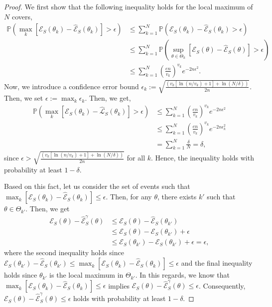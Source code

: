 \begin{proof}
We first show that the following inequality holds for the local maximum of $N$ covers,
\begin{align}
    \mathbb{P}\left(\max_{k}\left[\mathcal{E}_{S}(\theta_{k})-\hat{\mathcal{E}}_{S}(\theta_{k})\right] > \epsilon\right)
    &\leq \sum_{k=1}^{N}\mathbb{P}\left(\mathcal{E}_{S}(\theta_{k})-\hat{\mathcal{E}}_{S}(\theta_{k}) > \epsilon\right)\\
    &\leq \sum_{k=1}^{N}\mathbb{P}\left(\sup_{\theta\in\Theta_{k}}\left[\mathcal{E}_{S}(\theta)-\hat{\mathcal{E}}_{S}(\theta)\right] > \epsilon\right)\\
    &\leq\sum_{k=1}^{N}\left(\frac{en}{v_{k}}\right)^{v_{k}}e^{-2n\epsilon^{2}}.
\end{align}
Now, we introduce a confidence error bound $\epsilon_{k}:=\sqrt{\frac{\left(v_{k}\left[\ln\left(n/v_{k}\right)+1\right]+\ln\left(N/\delta\right)\right)}{2n}}$.
Then, we set $\epsilon:=\max_{k}\epsilon_{k}$. Then, we get,
\begin{align}
    \mathbb{P}\left(\max_{k}\left[\mathcal{E}_{S}(\theta_{k})-\hat{\mathcal{L}}_{S}(\theta_{k})\right] > \epsilon\right)
    &\leq\sum_{k=1}^{N}\left(\frac{en}{v_{k}}\right)^{v_{k}}e^{-2n\epsilon^{2}}\\
    &\leq\sum_{k=1}^{N}\left(\frac{en}{v_{k}}\right)^{v_{k}}e^{-2n\epsilon_{k}^{2}}\\
    &=\sum_{k=1}^{N}\frac{\delta}{N}=\delta,
\end{align}
since $\epsilon>\sqrt{\frac{\left(v_{k}\left[\ln\left(n/v_{k}\right)+1\right]+\ln\left(N/\delta\right)\right)}{2n}}$ for all $k$.
Hence, the inequality holds with probability at least $1-\delta$.

Based on this fact, let us consider the set of events such that $\max_{k}\left[\mathcal{E}_{S}(\theta_{k})-\hat{\mathcal{E}}_{S}(\theta_{k})\right] \leq \epsilon$.
Then, for any $\theta$, there exists $k'$ such that $\theta\in\Theta_{k'}$.
Then, we get
\begin{align}
    \mathcal{E}_{S}(\theta) - \hat{\mathcal{E}}_{S}^{\gamma}(\theta) &\leq \mathcal{E}_{S}(\theta) - \hat{\mathcal{E}}_{S}(\theta_{k'})\\
    &\leq \mathcal{E}_{S}(\theta) - \mathcal{E}_{S}(\theta_{k'}) + \epsilon\\
    &\leq \mathcal{E}_{S}(\theta_{k'}) - \mathcal{E}_{S}(\theta_{k'}) + \epsilon = \epsilon,
\end{align}
where the second inequality holds since $\mathcal{E}_{S}(\theta_{k'})-\hat{\mathcal{E}}_{S}(\theta_{k'})\leq\max_{k}\left[\mathcal{E}_{S}(\theta_{k})-\hat{\mathcal{E}}_{S}(\theta_{k})\right] \leq \epsilon$ and the final inequality holds since $\theta_{k'}$ is the local maximum in $\Theta_{k'}$.
In this regards, we know that $\max_{k}\left[\mathcal{E}_{S}(\theta_{k})-\hat{\mathcal{E}}_{S}(\theta_{k})\right] \leq \epsilon$ implies $\mathcal{E}_{S}(\theta) - \hat{\mathcal{E}}_{S}^{\gamma}(\theta) \leq \epsilon$.
Consequently, $\mathcal{E}_{S}(\theta) - \hat{\mathcal{E}}_{S}^{\gamma}(\theta) \leq \epsilon$ holds with probability at least $1-\delta$.
\end{proof}

